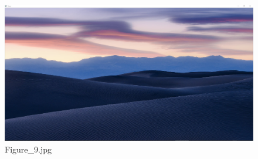 \documentclass{article}
\begin{document}
\begin{figure}[h]
\begin{center}
\includegraphics[width=1\textwidth]{images/b9}
\caption{\footnotesize{Figure\_9.jpg}}
\label{img:benchmark9}
\end{center}
\end{figure}
\end{document}
